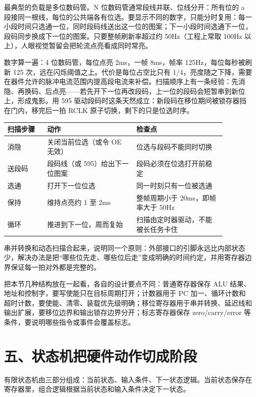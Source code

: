 最典型的负载是多位数码管。N 位数码管通常段线并联、位线分开：所有位的 a 段接同一根线，每位的公共端各有位选。要显示不同的数字，只能分时复用：每一小段时间只选通一位，同时段码线送出这一位的图案；下一小段时间选通下一位，段码同步换成下一位的图案。只要整帧刷新率超过约 50Hz（工程上常取 100Hz 以上），人眼视觉暂留会把轮流点亮看成同时常亮。

数字算一遍：4 位数码管，每位点亮 2ms，一帧 8ms，帧率 125Hz，每位每秒被刷新 125 次，远在闪烁阈值之上。代价是每位占空比只有 1/4，亮度随之下降，需要在器件允许的脉冲电流范围内提高段电流来补偿。扫描顺序上有一条经验：先消隐、再换码、后点亮——若先开下一位再改段码，上一位的段码会短暂串到新位上，形成鬼影。用 595 驱动段码时这条天然成立：新段码在移位期间被锁存器挡在门内，移完后一拍 RCLK 原子切换，剩下的只是位选时序。

\begin{longtable}{L{0.16\linewidth}L{0.36\linewidth}L{0.36\linewidth}}
\toprule
扫描步骤 & 动作 & 检查点 \\
\midrule
消隐 & 关闭当前位选（或令 OE 无效） & 位选与段码不能同时切换 \\
送段码 & 段码线（或 595）给出下一位图案 & 段码必须在位选打开前稳定 \\
选通 & 打开下一位位选 & 同一时刻只有一位被选通 \\
保持 & 维持点亮约 1 至 2ms & 整帧周期小于 20ms，即帧率大于 50Hz \\
循环 & 推进到下一位，周而复始 & 扫描由定时器驱动，不能被长任务卡住 \\
\bottomrule
\end{longtable}

串并转换和动态扫描合起来，说明同一个原则：外部接口的引脚永远比内部状态少，解决办法是把“哪些位先走、哪些位后走”变成明确的时间约定，并用寄存器边界保证每一拍对外都是完整的。

把本节几种结构放在一起看，各自的设计要点不同：普通寄存器保存 ALU 结果、地址和控制字，要写使能只在目标周期打开；计数器用于 PC 加一、循环计数和超时计数，要使能、清零、装载优先级明确；移位寄存器用于串并转换、延迟线和输出扩展，要移位边界和输出锁存边界分开；标志寄存器保存 zero/carry/error 等条件，要说明哪些指令或事件会覆盖标志。

\section{五、状态机把硬件动作切成阶段}

有限状态机由三部分组成：当前状态、输入条件、下一状态逻辑。当前状态保存在寄存器里，组合逻辑根据当前状态和输入条件决定下一状态。

